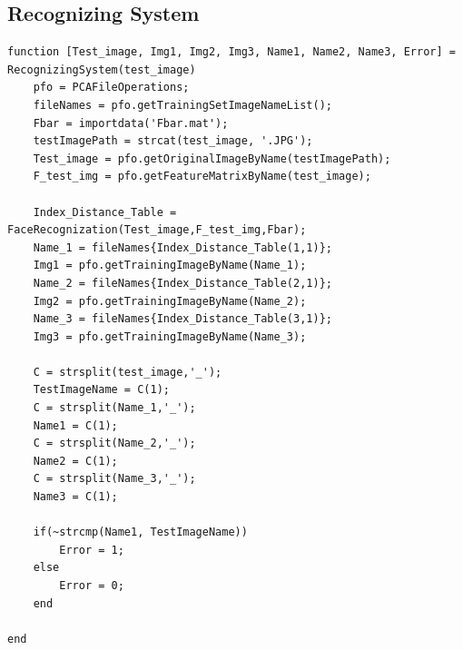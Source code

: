 \documentclass[]{article}
\begin{document}
\subsection*{Recognizing System}
\begin{verbatim}
function [Test_image, Img1, Img2, Img3, Name1, Name2, Name3, Error] = RecognizingSystem(test_image)
    pfo = PCAFileOperations;
    fileNames = pfo.getTrainingSetImageNameList();
    Fbar = importdata('Fbar.mat');
    testImagePath = strcat(test_image, '.JPG');
    Test_image = pfo.getOriginalImageByName(testImagePath);
    F_test_img = pfo.getFeatureMatrixByName(test_image);

    Index_Distance_Table = FaceRecognization(Test_image,F_test_img,Fbar);
    Name_1 = fileNames{Index_Distance_Table(1,1)};
    Img1 = pfo.getTrainingImageByName(Name_1);
    Name_2 = fileNames{Index_Distance_Table(2,1)};
    Img2 = pfo.getTrainingImageByName(Name_2);
    Name_3 = fileNames{Index_Distance_Table(3,1)};
    Img3 = pfo.getTrainingImageByName(Name_3);
    
    C = strsplit(test_image,'_');
    TestImageName = C(1);
    C = strsplit(Name_1,'_');
    Name1 = C(1);
    C = strsplit(Name_2,'_');
    Name2 = C(1);
    C = strsplit(Name_3,'_');
    Name3 = C(1);

    if(~strcmp(Name1, TestImageName))
        Error = 1;
    else
        Error = 0;
    end
    
end
\end{verbatim}
\end{document}
